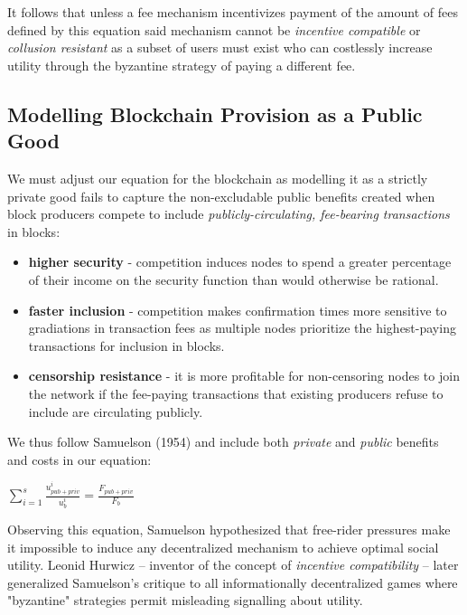 \documentclass[oneside]{article}   	%
\begin{document}
It follows that unless a fee mechanism incentivizes payment of the amount of fees defined by this equation said mechanism cannot be \textit{incentive compatible} or \textit{collusion resistant} as a subset of users must exist who can costlessly increase utility through the byzantine strategy of paying a different fee.

\subsection*{Modelling Blockchain Provision as a Public Good}

We must adjust our equation for the blockchain as modelling it as a strictly private good fails to capture the non-excludable public benefits created when block producers compete to include \textit{publicly-circulating, fee-bearing transactions} in blocks:

\begin{itemize}
  \item \textbf{higher security} - competition induces nodes to spend a greater percentage of their income on the security function than would otherwise be rational.
  \item \textbf{faster inclusion} - competition makes confirmation times more sensitive to gradiations in transaction fees as multiple nodes prioritize the highest-paying transactions for inclusion in blocks.
  \item \textbf{censorship resistance} - it is more profitable for non-censoring nodes to join the network if the fee-paying transactions that existing producers refuse to include are circulating publicly.
\end{itemize}

We thus follow Samuelson (1954) and include both \textit{private} and \textit{public} benefits and costs in our equation:

\LARGE
\begin{adjustwidth}{1.5em}{1.5em} 
\begin{math}
\sum_{i=1}^{s} \frac{u_{{pub}+{priv}}^i}{u_b^i} = \frac{F_{{pub}+{priv}}}{F_b}
\end{math}
\end{adjustwidth}
\normalsize

Observing this equation, Samuelson hypothesized that free-rider pressures make it impossible to induce any decentralized mechanism to achieve optimal social utility. Leonid Hurwicz -- inventor of the concept of \textit{incentive compatibility} -- later generalized Samuelson's critique to all informationally decentralized games where "byzantine" strategies permit misleading signalling about utility.
\end{document}
